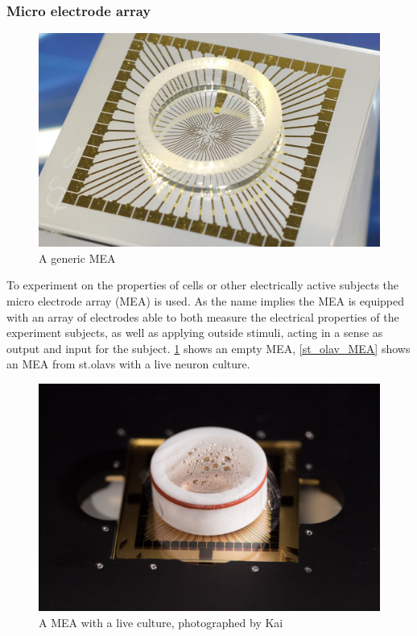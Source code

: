 \subsubsection{Micro electrode array}
\begin{figure}[h!]
    \includegraphics[width=\linewidth]{images/MEA.jpg}
    \caption{A generic MEA}
    \label{fig:generic_MEA}
\end{figure}
To experiment on the properties of cells or other electrically active subjects the
micro electrode array (MEA) is used. As the name implies the MEA is equipped with
an array of electrodes able to both measure the electrical properties of the 
experiment subjects, as well as applying outside stimuli, acting in a sense as
output and input for the subject. \ref{fig:generic_MEA} shows an empty MEA,
\ref{st_olav_MEA} shows an MEA from st.olavs with a live neuron culture.
\begin{figure}[h!]
    \includegraphics[width=\linewidth]{images/st-olavs-mea.jpg}
    \caption{A MEA with a live culture, photographed by Kai}
    \label{fig:st_olav_MEA}
\end{figure}

